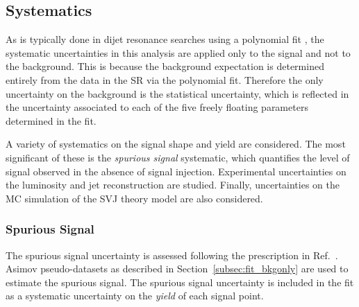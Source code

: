 
\subsection{Systematics}
\label{sec:syst}
As is typically done in dijet resonance searches using a polynomial fit \cite{dijet_uncert}, the systematic uncertainties in this analysis are applied only to the signal and not to the background.
This is because the background expectation is determined entirely from the data in the SR via the polynomial fit.
Therefore the only uncertainty on the background is the statistical uncertainty, which is reflected in the uncertainty associated to each of the five freely floating parameters determined in the fit.

A variety of systematics on the signal shape and yield are considered.
The most significant of these is the \textit{spurious signal} systematic, which quantifies the level of signal observed in the absence of signal injection.
Experimental uncertainties on the luminosity and jet reconstruction are studied.
Finally, uncertainties on the MC simulation of the SVJ theory model are also considered.

\subsubsection{Spurious Signal}

The spurious signal uncertainty is assessed following the prescription in Ref.~\cite{smooth_bkg}.
Asimov pseudo-datasets as described in Section~\ref{subsec:fit_bkgonly} are used to estimate the spurious signal.
The spurious signal uncertainty is included in the fit as a systematic uncertainty on the \textit{yield} of each signal point.

